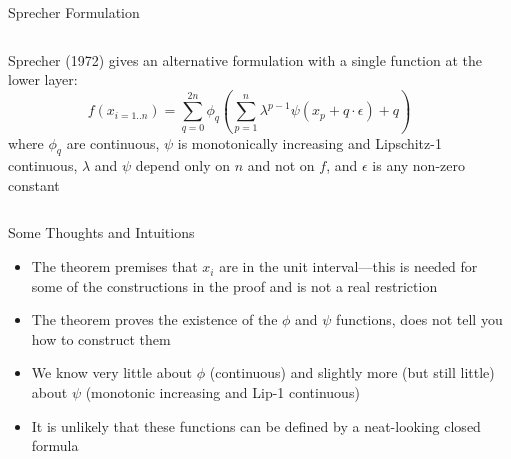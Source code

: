 \begin{frame}{Sprecher Formulation}

\begin{columns}

  \begin{column}{6cm}
  Sprecher (1972) gives an alternative formulation with a single function
  at the lower layer:
  $$
  f(x_{i=1..n}) = \sum_{q=0}^{2n}\phi_q\left(\sum_{p=1}^n\lambda^{p-1}\psi(x_p+q\cdot\epsilon)+q\right)
  $$
  where $\phi_q$ are continuous,
  $\psi$ is monotonically increasing and Lipschitz-1 continuous,
  $\lambda$ and $\psi$ depend only on $n$ and not on $f$,
  and $\epsilon$ is any non-zero constant
  \end{column}

  \begin{column}{7cm}
  
  \end{column}

\end{columns}

\end{frame}



\begin{frame}{Some Thoughts and Intuitions}

\begin{itemize}
\item The theorem premises that $x_i$ are in the unit interval---this
  is needed for some of the constructions in the proof and is not a
  real restriction \vspace{0.5em}
\item The theorem proves the existence of the $\phi$ and $\psi$
  functions, does not tell you how to construct them \vspace{0.5em}
\item We know very little about $\phi$ (continuous) and slightly more
  (but still little) about $\psi$ (monotonic increasing and
  Lip-1 continuous) \vspace{0.5em}
\item It is unlikely that these functions can be defined by a
  neat-looking closed formula
\end{itemize}

\end{frame}



